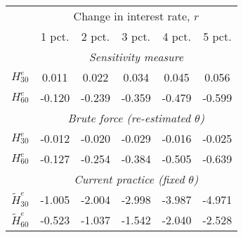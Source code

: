 \begin{tabular}{l*{5}{c}} \toprule 
& \multicolumn{5}{c}{ Change in interest rate, $r$ } \\ \cmidrule(lr){2-6}  
& 1 pct. & 2 pct. & 3 pct. & 4 pct. & 5 pct. \\ \midrule 
& \multicolumn{5}{c}{ \emph{Sensitivity measure} } \\ \cmidrule(lr){2-6}  
 $H^e_{30}$  & 0.011  & 0.022  & 0.034  & 0.045  & 0.056 
 \\ $H^e_{60}$  & -0.120  & -0.239  & -0.359  & -0.479  & -0.599 \\ \cmidrule(lr){2-6}  
& \multicolumn{5}{c}{ \emph{Brute force (re-estimated $\theta$)} } \\ \cmidrule(lr){2-6}
 $H^e_{30}$  & -0.012  & -0.020  & -0.029  & -0.016  & -0.025 \\ 
 $H^e_{60}$  & -0.127  & -0.254  & -0.384  & -0.505  & -0.639 \\ \cmidrule(lr){2-6}  
& \multicolumn{5}{c}{ \emph{Current practice (fixed $\theta$)} } \\ \cmidrule(lr){2-6}
 $\tilde{H}^e_{30}$  & -1.005  & -2.004  & -2.998  & -3.987  & -4.971 \\ 
 $\tilde{H}^e_{60}$  & -0.523  & -1.037  & -1.542  & -2.040  & -2.528 \\ 
 \bottomrule  \end{tabular} 
